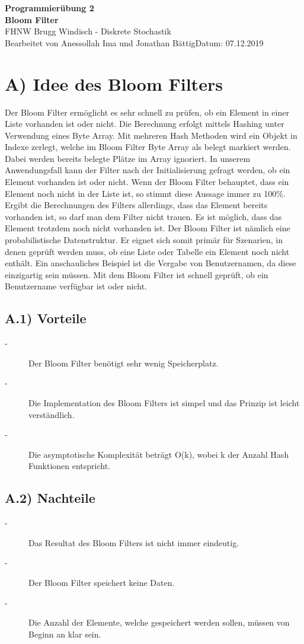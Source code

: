 \documentclass[a4paper, 11pt]{article}
\begin{document}
\noindent
\large\textbf{Programmierübung 2} \\
\textbf{Bloom Filter} \\
\normalsize FHNW Brugg Windisch - Diskrete Stochastik \\
Bearbeitet von Anessollah Ima und Jonathan Bättig\hfill Datum: 07.12.2019 \\
 

\section*{A) Idee des Bloom Filters}
Der Bloom Filter ermöglicht es sehr schnell zu prüfen, ob ein Element in einer Liste vorhanden ist oder nicht. Die Berechnung erfolgt mittels Hashing unter Verwendung eines Byte Array. Mit mehreren Hash Methoden wird ein Objekt in Indexe zerlegt, welche im Bloom Filter Byte Array als belegt markiert werden. Dabei werden bereits belegte Plätze im Array ignoriert. In unserem Anwendungsfall kann der Filter nach der Initialisierung gefragt werden, ob ein Element vorhanden ist oder nicht. Wenn der Bloom Filter behauptet, dass ein Element noch nicht in der Liste ist, so stimmt diese Aussage immer zu 100\%. Ergibt die Berechnungen des Filters allerdings, dass das Element bereits vorhanden ist, so darf man dem Filter nicht trauen. Es ist möglich, dass das Element trotzdem noch nicht vorhanden ist. Der Bloom Filter ist nämlich eine probabilistische Datenstruktur. Er eignet sich somit primär für Szenarien, in denen geprüft werden muss, ob eine Liste oder Tabelle ein Element noch nicht enthält. Ein anschauliches Beispiel ist die Vergabe von Benutzernamen, da diese einzigartig sein müssen. Mit dem Bloom Filter ist schnell geprüft, ob ein Benutzername verfügbar ist oder nicht.
\cite{Wikipedia}
\cite{Youtube}

\subsection*{A.1) Vorteile}
\begin{description}
\item[-]
Der Bloom Filter benötigt sehr wenig Speicherplatz.
\item[-]
Die Implementation des Bloom Filters ist simpel und das Prinzip ist leicht verständlich.
\item[-]
Die asymptotische Komplexität beträgt O(k), wobei k der Anzahl Hash Funktionen entspricht.
\end{description}

\subsection*{A.2) Nachteile}
\begin{description}
\item[-]
Das Resultat des Bloom Filters ist nicht immer eindeutig.
\item[-]
Der Bloom Filter speichert keine Daten.
\item[-]
Die Anzahl der Elemente, welche gespeichert werden sollen, müssen von Beginn an klar sein.
\end{description}
\end{document}
